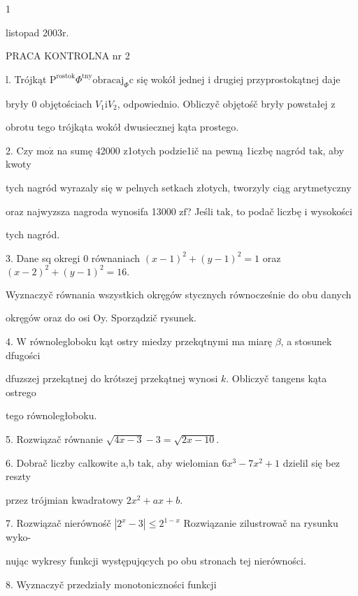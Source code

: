 \documentclass[a4paper,12pt]{article}
\begin{document}
1




listopad 2003r.

PRACA KONTROLNA nr 2

l. Trójkąt $\mathrm{P}^{\mathrm{r}\mathrm{o}\mathrm{s}\mathrm{t}\mathrm{o}\mathrm{k}}\Phi^{\mathrm{t}\mathrm{n}\mathrm{y}} \mathrm{o}\mathrm{b}\mathrm{r}\mathrm{a}\mathrm{c}\mathrm{a}\mathrm{j}_{\Phi}\mathrm{c}$ się wokół jednej $\mathrm{i}$ drugiej przyprostokątnej daje

bryły $0$ objętościach $V_{1} \mathrm{i} V_{2}$, odpowiednio. Obliczyč objętośč bryły powstałej $\mathrm{z}$

obrotu tego trójkąta wokół dwusiecznej kąta prostego.

2. Czy $\mathrm{m}\mathrm{o}\dot{\mathrm{z}}$ na sumę 42000 z1otych podzie1ič na pewną 1iczbę nagród $\mathrm{t}\mathrm{a}\mathrm{k}$, aby kwoty

tych nagród wyrazaly się $\mathrm{w}$ pelnych setkach złotych, tworzyly ciąg arytmetyczny

oraz najwyzsza nagroda wynosifa 13000 $\mathrm{z}\mathrm{f}$? Jeśli $\mathrm{t}\mathrm{a}\mathrm{k}$, to podač liczbę $\mathrm{i}$ wysokości

tych nagród.

3. Dane sq okregi $0$ równaniach $(x-1)^{2}+(y-1)^{2}=1$ oraz $(x-2)^{2}+(y-1)^{2}=16.$

Wyznaczyč równania wszystkich okręgów stycznych równocześnie do obu danych

okręgów oraz do osi Oy. Sporządzič rysunek.

4. $\mathrm{W}$ równolegloboku kąt ostry miedzy przekqtnymi ma miarę $\beta$, a stosunek dfugości

dfuzszej przekątnej do krótszej przekątnej wynosi $k$. Obliczyč tangens kąta ostrego

tego równoległoboku.

5. Rozwiązač równanie $\sqrt{4x-3}-3=\sqrt{2x-10}.$

6. Dobrač liczby calkowite a,b $\mathrm{t}\mathrm{a}\mathrm{k}$, aby wielomian $6x^{3}-7x^{2}+1$ dzielil się bez reszty

przez trójmian kwadratowy $2x^{2}+ax+b.$

7. Rozwiązač nierównośč $|2^{x}-3|\leq 2^{1-x}$ Rozwiązanie zilustrowač na rysunku wyko-

nując wykresy funkcji występujqcych po obu stronach tej nierówności.

8. Wyznaczyč przedziały monotoniczności funkcji
\end{document}
